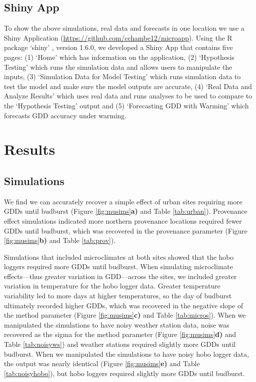 \documentclass{article}\usepackage[]{graphicx}\usepackage[]{color}
\begin{document}
\subsection*{Shiny App}
To show the above simulations, real data and forecasts in one location we use a Shiny Application (\url{https://github.com/cchambe12/microapp}). Using the R package `shiny' \citep{shiny2021}, version 1.6.0, we developed a Shiny App that contains five pages: (1) `Home' which has information on the application, (2) `Hypothesis Testing' which runs the simulation data and allows users to manipulate the inputs, (3) `Simulation Data for Model Testing' which runs simulation data to test the model and make sure the model outputs are accurate, (4) `Real Data and Analyze Results' which uses real data and runs analyses to be used to compare to the `Hypothesis Testing' output and (5) `Forecasting GDD with Warming' which forecasts GDD accuracy under warming. 

\section*{Results}
\subsection*{Simulations}
We find we can accurately recover a simple effect of urban sites requiring more GDDs until budburst (Figure \ref{fig:musims}\textbf{a)} and Table \ref{tab:urban}). Provenance effect simulations indicated more northern provenance locations required fewer GDDs until budburst, which was recovered in the provenance parameter (Figure \ref{fig:musims}\textbf{b)} and Table \ref{tab:prov}). 

Simulations that included microclimates at both sites showed that the hobo loggers required more GDDs until budburst. When simulating microclimate effects---thus greater variation in GDD---across the sites, we included greater variation in temperature for the hobo logger data. Greater temperature variability led to more days at higher temperatures, so the day of budburst ultimately recorded higher GDDs, which was recovered in the negative slope of the method parameter (Figure \ref{fig:musims}\textbf{c)} and Table \ref{tab:micros}). When we manipulated the simulations to have noisy weather station data, noise was recovered as the sigma for the method parameter (Figure \ref{fig:musims}\textbf{d)} and Table \ref{tab:noisyws}) and weather stations required slightly more GDDs until budburst. When we manipulated the simulations to have noisy hobo logger data, the output was nearly identical (Figure \ref{fig:musims}\textbf{e)} and Table \ref{tab:noisyhobo}), but hobo loggers required slightly more GDDs until budburst.
  
\end{document}

